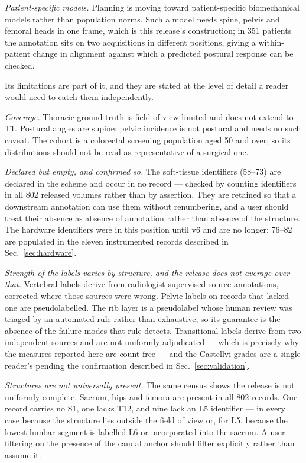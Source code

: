 \documentclass[aapm,mph,amsmath,amssymb,reprint,linenumbers]{revtex4-2}
\begin{document}
\emph{Patient-specific models.} Planning is moving toward patient-specific biomechanical
models rather than population norms.\cite{hamilton2026} Such a model needs spine, pelvis and
femoral heads in one frame, which is this release's construction; in 351 patients the
annotation sits on two acquisitions in different positions, giving a within-patient change in
alignment against which a predicted postural response can be checked.

Its limitations are part of it, and they are stated at the level of detail a reader would
need to catch them independently.

\emph{Coverage.} Thoracic ground truth is field-of-view limited and does not extend to T1.
Postural angles are supine; pelvic incidence is not postural and needs no such caveat. The
cohort is a colorectal screening population aged 50 and over, so its distributions should
not be read as representative of a surgical one.

\emph{Declared but empty, and confirmed so.} The soft-tissue identifiers (58--73) are
declared in the scheme and occur in no record --- checked by counting identifiers in all 802
released volumes rather than by assertion. They are retained so that a downstream annotation
can use them without renumbering, and a user should treat their absence as absence of
annotation rather than absence of the structure. The hardware identifiers were in this
position until v6 and are no longer: 76--82 are populated in the eleven instrumented records
described in Sec.~\ref{sec:hardware}.

\emph{Strength of the labels varies by structure, and the release does not average over
that.} Vertebral labels derive from radiologist-supervised source annotations, corrected
where those sources were wrong. Pelvic labels on records that lacked one are
pseudolabelled. The rib layer is a pseudolabel whose human review was triaged by an
automated rule rather than exhaustive, so its guarantee is the absence of the failure modes
that rule detects. Transitional labels derive from two independent sources and are not
uniformly adjudicated --- which is precisely why the measures reported here are count-free
--- and the Castellvi grades are a single reader's pending the confirmation described in
Sec.~\ref{sec:validation}.

\emph{Structures are not universally present.} The same census shows the release is not
uniformly complete. Sacrum, hips and femora are present in all 802 records. One record
carries no S1, one lacks T12, and nine lack an L5 identifier --- in every case because the
structure lies outside the field of view or, for L5, because the lowest lumbar segment is
labelled L6 or incorporated into the sacrum. A user filtering on the presence of the caudal
anchor should filter explicitly rather than assume it.
\end{document}
